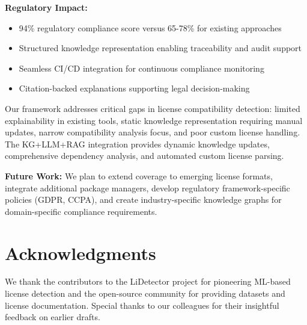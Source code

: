 \documentclass[9pt,twocolumn]{article}
\begin{document}
\textbf{Regulatory Impact:}
\begin{itemize}
    \item 94\% regulatory compliance score versus 65-78\% for existing approaches
    \item Structured knowledge representation enabling traceability and audit support
    \item Seamless CI/CD integration for continuous compliance monitoring
    \item Citation-backed explanations supporting legal decision-making
\end{itemize}

Our framework addresses critical gaps in license compatibility detection: limited explainability in existing tools, static knowledge representation requiring manual updates, narrow compatibility analysis focus, and poor custom license handling. The KG+LLM+RAG integration provides dynamic knowledge updates, comprehensive dependency analysis, and automated custom license parsing.

\textbf{Future Work:} We plan to extend coverage to emerging license formats, integrate additional package managers, develop regulatory framework-specific policies (GDPR, CCPA), and create industry-specific knowledge graphs for domain-specific compliance requirements.

\section*{Acknowledgments}
We thank the contributors to the LiDetector project for pioneering ML-based license detection and the open-source community for providing datasets and license documentation. Special thanks to our colleagues for their insightful feedback on earlier drafts.
\end{document}
